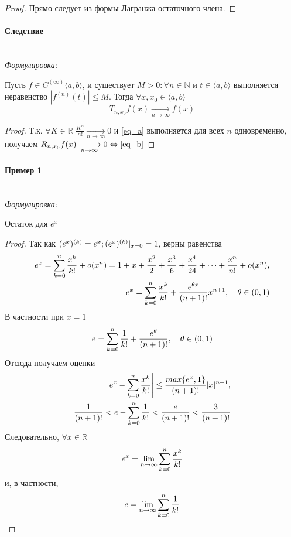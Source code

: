 \documentclass{article}
\let\vanillaparagraph\paragraph
\renewcommand{\paragraph}[1]{\vanillaparagraph{#1}\mbox{}\\}
\begin{document}
\begin{proof}
Прямо следует из формы Лагранжа остаточного члена.
\end{proof}

\paragraph{Следствие}

\textit{Формулировка: }

Пусть $f \in C^{(\infty)} \langle a, b\rangle$, и существует $M > 0: \forall n \in \mathbb{N} \text{ и } t \in \langle a, b\rangle$ выполняется неравенство $| f^{(n)}(t)| \leq M$. Тогда $\forall x, x_0 \in \langle a, b\rangle$
\begin{equation} \label{eq_b}
T_{n, x_0} f(x) \xrightarrow[n\to\infty]{}f(x)
\end{equation}

\begin{proof}
Т.к. $\forall K \in \mathbb{R}$ $ \frac{K^n} {n!} \xrightarrow[n\to\infty]{} 0$ и \eqref{eq_a} выполняется для всех $n$ одновременно, получаем $R_{n, x_0}f(x) \xrightarrow[n \to\infty]{} 0 \Leftrightarrow \eqref{eq_b}$
\end{proof}

\paragraph{Пример 1}

\textit{Формулировка: }

Остаток для $e^x$

\begin{proof}
Так как $(e^x)^{(k)} = e^x; (e^x)^{(k)} \arrowvert_{x=0} = 1$, верны равенства
\begin{eqnarray}
e^x = \sum_{k=0}^n \frac{x^k} {k!} + o(x^n) = 1 + x + \frac{x^2} {2} + \frac{x^3} {6} + \frac{x^4} {24} + \dots + \frac{x^n} {n!} + o(x^n),\notag\\
e^x = \sum_{k=0}^n \frac{x^k} {k!} + \frac{e^{\theta x}}{(n+1)!} x^{n+1}, \quad \theta \in(0, 1) \notag
\end{eqnarray}
В частности при $x = 1$
\begin{equation}
e = \sum_{k = 0}^n \frac{1} {k!} + \frac{e^\theta} {(n + 1)!}, \quad \theta \in (0, 1) \notag
\end{equation}
Отсюда получаем оценки 
\begin{eqnarray}
\left|e^x - \sum_{k=0}^n\frac{x^k}{k!}\right| \leq \frac{max\{e^x, 1\}} {(n+1)!} |x|^{n+1},\notag\\
\frac{1} {(n+1)!} < e - \sum_{k=0}^n \frac{1}{k!} < \frac {e} {(n+1)!} < \frac{3} {(n+1)!}\notag
\end{eqnarray}
Следовательно, $\forall x \in \mathbb{R}$
\begin{equation}
e^x = \lim_{n\to\infty} \sum_{k = 0}^n \frac{x^k} {k!}\notag
\end{equation}
и, в частности,
\begin{equation}
e = \lim_{n\to\infty}\sum_{k=0}^n \frac{1}{k!} \notag
\end{equation}
\end{proof}
\end{document}

